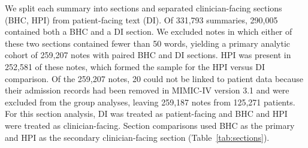 \documentclass[unnumsec,webpdf,contemporary,large]{oup-authoring-template}
\newcommand{\td}[1]{\sethlcolor{pink}\hl{[Ting: #1]}}
\begin{document}

We split each summary into sections and separated clinician-facing sections (BHC, HPI) from patient-facing text (DI). Of 331,793 summaries, 290,005 contained both a BHC and a DI section. We excluded notes in which either of these two sections contained fewer than 50 words, yielding a primary analytic cohort of 259,207 notes with paired BHC and DI sections. HPI was present in 252,581 of these notes, which formed the sample for the HPI versus DI comparison. Of the 259,207 notes, 20 could not be linked to patient data because their admission records had been removed in MIMIC-IV version 3.1 and were excluded from the group analyses, %
leaving 259,187 notes from 125,271 patients. %
For this section analysis, DI was treated as patient-facing and BHC and HPI were treated as clinician-facing. Section comparisons used BHC as the primary and HPI as the secondary clinician-facing section (Table~\ref{tab:sections}).
\end{document}
